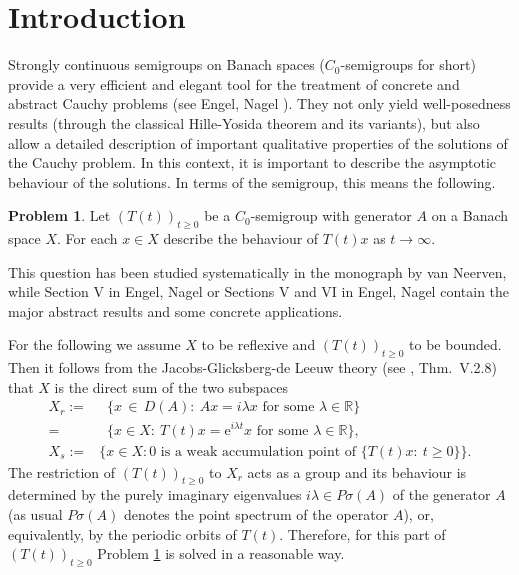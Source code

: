\documentclass[11pt,intlimits, draft,oneside]{amsart}
\theoremstyle{definition}
\newtheorem{problem}[thm]{Problem}
\def\clin{\mathop{\overline{\mathrm{lin}}}}
\def\Psigma{P\sigma}
\def\ee{\mathrm{e}}
\def\RR{\mathbb{R}}
\begin{document}
\maketitle




\section{Introduction}

Strongly continuous semigroups on Banach spaces ($C_0$-semigroups
for short) provide a very efficient and elegant tool for the
treatment of concrete and abstract Cauchy problems (see Engel, Nagel
\cite{engel/nagel:2000}). They not only yield well-posedness results
(through the classical Hille-Yosida theorem and its variants), but
also allow a detailed description of important qualitative
properties of the solutions of the Cauchy problem. In this context,
it is 
important to describe the asymptotic behaviour of the
solutions. In terms of the semigroup, this means the following.
%
\begin{problem}\label{problem1}
Let $(T(t))_{t\geq 0}$ be a $C_0$-semigroup with generator $A$ on a
Banach space $X$. For each $x\in X$ describe the behaviour of
$T(t)x$ as $t\to\infty$.
\end{problem}
%
This question has been studied systematically in the monograph \cite{vanneerven:1996} by 
van Neerven, while Section V in Engel, Nagel \cite{engel/nagel:2000} 
or Sections V and VI in Engel, Nagel \cite{engel/nagel:2006} contain the major abstract 
results and some concrete applications.

For the following we assume $X$ to be reflexive and $(T(t))_{t\geq 0}$ to be bounded.
Then it follows from the Jacobs-Glicksberg-de Leeuw theory (see
\cite{engel/nagel:2000}, Thm.~V.2.8) that $X$ is the direct sum of
the two subspaces
%
\begin{align*}
X_r :=& \clin \bigl\{x \,\in\, D(A):\ Ax= i\lambda x \text{ for some } \lambda \in \RR \bigr\} \\
     =& \clin \bigl\{x\in X:\ T(t)x=\ee^{i\lambda t}x  \text{ for some } \lambda \in \RR  \bigr\},\\
X_s :=& \bigl\{ x \in X : 0 \text{ is a weak accumulation point of }
\{ T(t)x:\: t\geq 0 \} \bigr\}.
\end{align*}
%
The restriction of $(T(t))_{t\geq 0}$ to $X_r$ acts as a group and
its behaviour is determined by the purely imaginary eigenvalues
$i\lambda \in \Psigma(A)$ of the generator $A$ (as usual
$\Psigma(A)$ denotes the point spectrum of the operator $A$), or,
equivalently, by the periodic orbits of $T(t)$. Therefore, for this
part of $(T(t))_{t\geq 0}$ Problem \ref{problem1} is solved in a
reasonable way.
\end{document}
